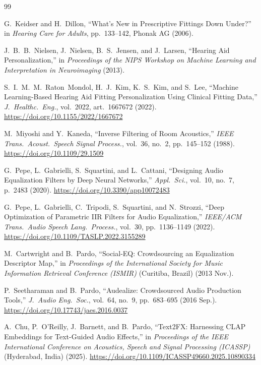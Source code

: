 \documentclass{aes2e}
\begin{document}

\begin{thebibliography}{99}

G.~Keidser and H.~Dillon,
``What's New in Prescriptive Fittings Down Under?''
in \emph{Hearing Care for Adults}, pp.~133--142, Phonak AG (2006).

J.~B.~B.~Nielsen, J.~Nielsen, B.~S.~Jensen, and J.~Larsen,
``Hearing Aid Personalization,''
in \emph{Proceedings of the NIPS Workshop on Machine Learning and
Interpretation in Neuroimaging} (2013).

S.~I.~M.~M.~Raton~Mondol, H.~J.~Kim, K.~S.~Kim, and S.~Lee,
``Machine Learning-Based Hearing Aid Fitting Personalization Using
Clinical Fitting Data,''
\emph{J.\ Healthc.\ Eng.}, vol.~2022, art.~1667672 (2022).
\url{https://doi.org/10.1155/2022/1667672}

M.~Miyoshi and Y.~Kaneda,
``Inverse Filtering of Room Acoustics,''
\emph{IEEE Trans.\ Acoust.\ Speech Signal Process.}, vol.~36, no.~2,
pp.~145--152 (1988).
\url{https://doi.org/10.1109/29.1509}

G.~Pepe, L.~Gabrielli, S.~Squartini, and L.~Cattani,
``Designing Audio Equalization Filters by Deep Neural Networks,''
\emph{Appl.\ Sci.}, vol.~10, no.~7, p.~2483 (2020).
\url{https://doi.org/10.3390/app10072483}

G.~Pepe, L.~Gabrielli, C.~Tripodi, S.~Squartini, and N.~Strozzi,
``Deep Optimization of Parametric IIR Filters for Audio Equalization,''
\emph{IEEE/ACM Trans.\ Audio Speech Lang.\ Process.}, vol.~30,
pp.~1136--1149 (2022).
\url{https://doi.org/10.1109/TASLP.2022.3155289}

M.~Cartwright and B.~Pardo,
``Social-EQ: Crowdsourcing an Equalization Descriptor Map,''
in \emph{Proceedings of the International Society for Music Information
Retrieval Conference (ISMIR)} (Curitiba, Brazil) (2013 Nov.).

P.~Seetharaman and B.~Pardo,
``Audealize: Crowdsourced Audio Production Tools,''
\emph{J.\ Audio Eng.\ Soc.}, vol.~64, no.~9, pp.~683--695 (2016 Sep.).
\url{https://doi.org/10.17743/jaes.2016.0037}

A.~Chu, P.~O'Reilly, J.~Barnett, and B.~Pardo,
``Text2FX: Harnessing CLAP Embeddings for Text-Guided Audio Effects,''
in \emph{Proceedings of the IEEE International Conference on Acoustics,
Speech and Signal Processing (ICASSP)} (Hyderabad, India) (2025).
\url{https://doi.org/10.1109/ICASSP49660.2025.10890334}


\end{thebibliography}
\end{document}
